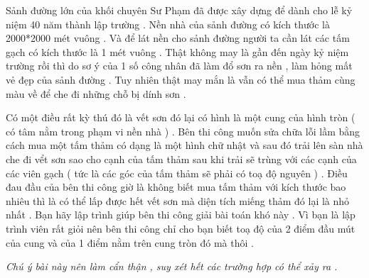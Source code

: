 Sảnh đường lớn của khối chuyên Sư Phạm đã được xây dựng để dành cho lễ kỷ niệm 40 năm thành lập trường . Nền nhà của sảnh đường có kích thước là 2000*2000 mét vuông . Và để lát nền cho sảnh đường người ta cần lát các tấm gạch có kích thước là 1 mét vuông . Thật không may là gần đến ngày kỷ niệm trường rồi thì do sơ ý của 1 số công nhân đã làm đổ sơn ra nền , làm hỏng mất vẻ đẹp của sảnh đường . Tuy nhiên thật may mắn là vẫn có thể mua thảm cùng màu về để che đi những chỗ bị dính sơn .   


   Có một điều rất kỳ thú đó là vết sơn đó lại có hình là một cung của hình tròn ( có tâm nằm trong phạm vi nền nhà ) . Bên thi công muốn sửa chữa lỗi lầm bằng cách mua một tấm thảm có dạng là một hình chữ nhật và sau đó trải lên sàn nhà che đi vểt sơn sao cho cạnh của tấm thảm sau khi trải sẽ trùng với các cạnh của các viên gạch ( tức là các góc của tấm thảm sẽ phải có toạ độ nguyên ) . Điều đau đầu của bên thi công giờ là không biết mua tấm thảm với kích thước bao nhiêu thì là có thể lấp được hết vết sơn mà diện tích miếng thảm đó lại là nhỏ nhất . Bạn hãy lập trình giúp bên thi công giải bài toán khó này . Vì bạn là lập trình viên rất giỏi nên bên thi công chỉ cho bạn biết toạ độ của 2 điểm đầu mút của cung và của 1 điểm nằm trên cung tròn đó mà thôi .   





\textit{    Chú ý bài này nên làm cẩn thận , suy xét hết các trường hợp có thể xảy ra .   }